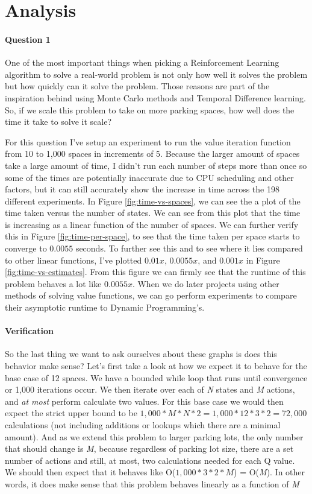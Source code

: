 \documentclass[12pt]{article}
\begin{document}
\section{Analysis} \label{sect:analysis}

\paragraph{Question 1} One of the most important things when picking a Reinforcement Learning algorithm to solve a real-world problem is not only how well it solves the problem but how quickly can it solve the problem. Those reasons are part of the inspiration behind using Monte Carlo methods and Temporal Difference learning. So, if we scale this problem to take on more parking spaces, how well does the time it take to solve it scale?

For this question I've setup an experiment to run the value iteration function from 10 to 1,000 spaces in increments of 5. Because the larger amount of spaces take a large amount of time, I didn't run each number of steps more than once so some of the times are potentially inaccurate due to CPU scheduling and other factors, but it can still accurately show the increase in time across the 198 different experiments. In Figure \ref{fig:time-vs-spaces}, we can see the a plot of the time taken versus the number of states. We can see from this plot that the time is increasing as a linear function of the number of spaces. We can further verify this in Figure \ref{fig:time-per-space}, to see that the time taken per space starts to converge to $0.0055$ seconds. To further see this and to see where it lies compared to other linear functions, I've plotted $0.01x$, $0.0055x$, and $0.001x$ in Figure \ref{fig:time-vs-estimates}. From this figure we can firmly see that the runtime of this problem behaves a lot like $0.0055x$.
When we do later projects using other methods of solving value functions, we can go perform experiments to compare their asymptotic runtime to Dynamic Programming's.

\paragraph{Verification} So the last thing we want to ask ourselves about these graphs is does this behavior make sense?
Let's first take a look at how we expect it to behave for the base case of 12 spaces. We have a bounded while loop that runs until convergence or 1,000 iterations occur. We then iterate over each of \textit{N} states and \textit{M} actions, and \textit{at most} perform calculate two values. For this base case we would then expect the strict upper bound to be $1,000 * M * N * 2 = 1,000 * 12 * 3 * 2 = 72,000$ calculations (not including additions or lookups which there are a minimal amount). And as we extend this problem to larger parking lots, the only number that should change is \textit{M}, because regardless of parking lot size, there are a set number of actions and still, at most, two calculations needed for each Q value. We should then expect that it behaves like O($1,000 * 3 * 2 * M$) = O(\textit{M}). In other words, it does make sense that this problem behaves linearly as a function of \textit{M}
\end{document}

